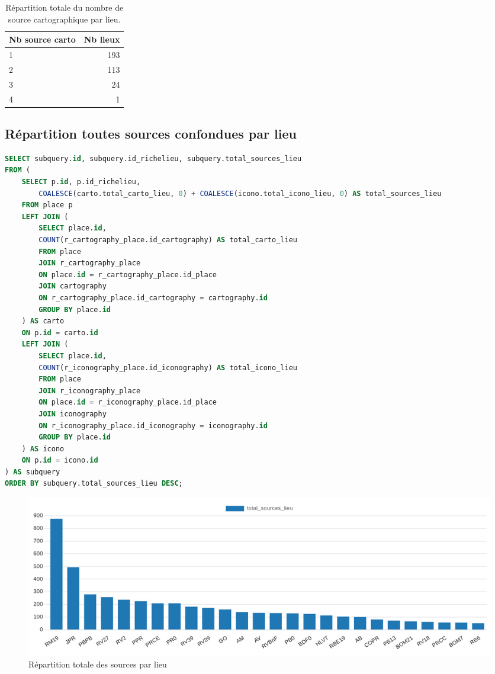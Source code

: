 \begin{table}[h!]
    \centering
    \begin{tabular}{|l|r|}
        \toprule
        \textbf{Nb source carto} & \textbf{Nb lieux} \\
        \midrule
        1 & 193 \\
        2 & 113 \\
        3 & 24 \\
        4 & 1 \\
        \bottomrule
    \end{tabular}
    \label{tab:repartition_lieu_carto}
    \caption{Répartition totale du nombre de source cartographique par lieu.}
\end{table}

\newpage
\subsection{Répartition toutes sources confondues par lieu}
\begin{lstlisting}[language=SQL, caption=Requête SQL pour répartition des sources par lieu]
SELECT subquery.id, subquery.id_richelieu, subquery.total_sources_lieu
FROM (
    SELECT p.id, p.id_richelieu,  
        COALESCE(carto.total_carto_lieu, 0) + COALESCE(icono.total_icono_lieu, 0) AS total_sources_lieu
    FROM place p
    LEFT JOIN (
        SELECT place.id, 
        COUNT(r_cartography_place.id_cartography) AS total_carto_lieu 
        FROM place 
        JOIN r_cartography_place 
        ON place.id = r_cartography_place.id_place 
        JOIN cartography  
    	ON r_cartography_place.id_cartography = cartography.id 
        GROUP BY place.id
    ) AS carto 
    ON p.id = carto.id
    LEFT JOIN (
        SELECT place.id, 
        COUNT(r_iconography_place.id_iconography) AS total_icono_lieu 
        FROM place 
        JOIN r_iconography_place 
        ON place.id = r_iconography_place.id_place 
        JOIN iconography  
        ON r_iconography_place.id_iconography = iconography.id 
        GROUP BY place.id
    ) AS icono 
    ON p.id = icono.id
) AS subquery
ORDER BY subquery.total_sources_lieu DESC;\end{lstlisting}

\begin{figure}[h!]
    \centering
    \includegraphics[width=1\linewidth]{images/graphiques/total_source_lieu.png}
    \caption{Répartition totale des sources par lieu}
    \label{fig:total_source_lieu}
\end{figure}
\newpage

